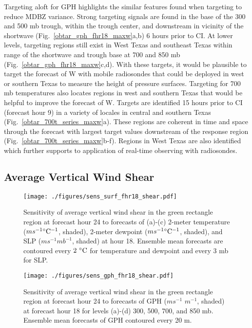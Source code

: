 \documentclass{ttuthes2007}
\newcommand{\tab}{\hspace*{2em}}  %
\begin{document}
\tab Targeting aloft for GPH highlights the similar features found when targeting to reduce MDBZ variance. Strong targeting signals are found in the base of the 300 and 500 mb trough, within the trough center, and downstream in vicinity of the shortwave (Fig.~\ref{obtar_gph_fhr18_maxw}a,b) 6 hours prior to CI. At lower levels, targeting regions still exist in West Texas and southeast Texas within range of the shortwave and trough base at 700 and 850 mb (Fig.~\ref{obtar_gph_fhr18_maxw}c,d). With these targets, it would be plausible to target the forecast of W with mobile radiosondes that could be deployed in west or southern Texas to measure the height of pressure surfaces. Targeting for 700 mb temperatures also locates regions in west and southern Texas that would be helpful to improve the forecast of W. Targets are identified 15 hours prior to CI (forecast hour 9) in a variety of locales in central and southern Texas (Fig.~\ref{obtar_700t_series_maxw}a). These regions are coherent in time and space through the forecast with largest target values downstream of the response region (Fig.~\ref{obtar_700t_series_maxw}b-f). Regions in West Texas are also identified which further supports to application of real-time observing with radiosondes.   

\subsection{Average Vertical Wind Shear}

\begin{figure}[!tb]
  \centering
  \noindent\texttt{[image: ./figures/sens\_surf\_fhr18\_shear.pdf]}\\
  \caption{Sensitivity of average vertical wind shear in the green rectangle region at forecast hour 24 to forecasts of (a)-(c) 2-meter temperature ($ms^{-1} {}^{\circ} {\rm C^{-1}}$, shaded), 2-meter dewpoint ($ms^{-1} {}^{\circ} {\rm C^{-1}}$, shaded), and SLP ($ms^{-1} mb^{-1}$, shaded) at hour 18. Ensemble mean forecasts are contoured every $2^{~\circ} {\rm C}$ for temperature and dewpoint and every 3 mb for SLP.}
\label{sens_surf_fhr18_shear}
\end{figure}

\begin{figure}[!tb]
  \centering
  \noindent\texttt{[image: ./figures/sens\_gph\_fhr18\_shear.pdf]}\\
  \caption{Sensitivity of average vertical wind shear in the green rectangle region at forecast hour 24 to forecasts of GPH ($ms^{-1}$ $m^{-1}$, shaded) at forecast hour 18 for levels (a)-(d) 300, 500, 700, and 850 mb. Ensemble mean forecasts of GPH contoured every 20 m.}
\label{sens_gph_fhr18_shear}
\end{figure}
\end{document}

